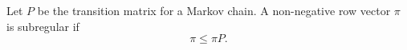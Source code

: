 Let $P$ be the transition matrix for a Markov chain. A non-negative row vector $\pi$ is subregular if
$$\pi \leq \pi P.$$
